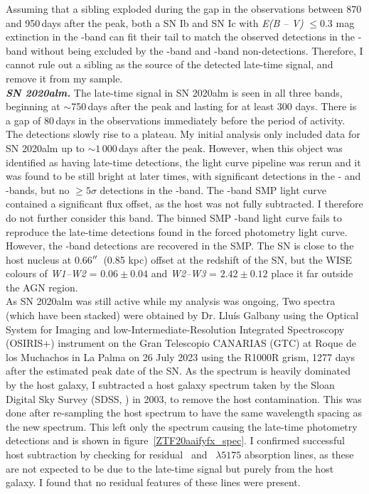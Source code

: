 \documentclass[a4paper,oneside,12pt, class=Latex/Classes/PhDthesisPSnPDF, crop=false]{standalone}
\begin{document}
Assuming that a sibling exploded during the gap in the observations between 870 and 950\,days after the peak, both a SN Ib and SN Ic with \textit{E(B -- V)} $\leq 0.3$ mag extinction in the \ztfr-band can fit their tail to match the observed detections in the \ztfr-band without being excluded by the \ztfg-band and \ztfi-band non-detections. Therefore, I cannot rule out a sibling as the source of the detected late-time signal, and remove it from my sample.\\

\textit{\textbf{SN 2020alm.}}
The late-time signal in SN 2020alm is seen in all three bands, beginning at $\sim$750\,days after the peak and lasting for at least 300 days. There is a gap of 80\,days in the observations immediately before the period of activity. The detections slowly rise to a plateau. My initial analysis only included data for SN 2020alm up to $\sim1\,000$\,days after the peak. However, when this object was identified as having late-time detections, the light curve pipeline was rerun and it was found to be still bright at later times, with significant detections in the \ztfr- and \ztfi-bands, but no $\geq5\sigma$ detections in the \ztfg-band. The \ztfi-band SMP light curve contained a significant flux offset, as the host was not fully subtracted. I therefore do not further consider this band. The binned SMP \ztfr-band light curve fails to reproduce the late-time detections found in the forced photometry light curve. However, the \ztfg-band detections are recovered in the SMP. The SN is close to the host nucleus at 0.66$^{\prime\prime}$~(0.85 kpc) offset at the redshift of the SN, but the WISE colours of \textit{W1--W2} = $0.06\pm0.04$ and \textit{W2--W3} = $2.42\pm0.12$ place it far outside the AGN region.\\

As SN 2020alm was still active while my analysis was ongoing, Two spectra (which have been stacked) were obtained by Dr. Lluís Galbany using the Optical System for Imaging and low-Intermediate-Resolution Integrated Spectroscopy (OSIRIS+) instrument on the Gran Telescopio CANARIAS (GTC) at Roque de los Muchachos in La Palma on 26 July 2023 using the R1000R grism, 1277 days after the estimated peak date of the SN. As the spectrum is heavily dominated by the host galaxy, I subtracted a host galaxy spectrum taken by the Sloan Digital Sky Survey (SDSS, \citealt{SDSS-I-II, SDSS_DR4, SDSS_telescope, SDSS_Spectograph}) in 2003, to remove the host contamination. This was done after re-sampling the host spectrum to have the same wavelength spacing as the new spectrum. This left only the spectrum causing the late-time photometry detections and is shown in figure~\ref{ZTF20aaifyfx_spec}. I confirmed successful host subtraction by checking for residual \NaID~and \MgI~${\lambda5175}$ absorption lines, as these are not expected to be due to the late-time signal but purely from the host galaxy. I found that no residual features of these lines were present.
\end{document}

